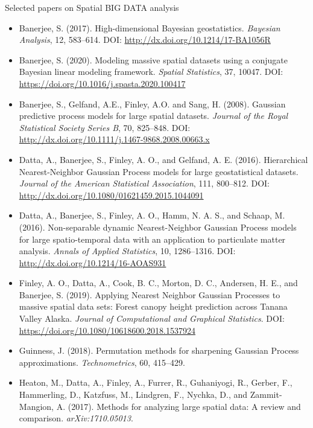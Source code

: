 \documentclass[
10pt]{beamer}
\begin{document}
\begin{frame}{Selected papers on Spatial BIG DATA analysis}

{\tiny
\begin{itemize}
 \item Banerjee, S. (2017). High-dimensional Bayesian geostatistics. \emph{Bayesian Analysis}, 12, 583--614. DOI: \url{http://dx.doi.org/10.1214/17-BA1056R}

 \item Banerjee, S. (2020). Modeling massive spatial datasets using a conjugate Bayesian linear modeling framework. \emph{Spatial Statistics}, 37, 10047. DOI: \url{https://doi.org/10.1016/j.spasta.2020.100417}
 
 \item Banerjee, S., Gelfand, A.E., Finley, A.O. and Sang, H. (2008). Gaussian predictive process models for large spatial datasets. \emph{Journal of the Royal Statistical Society Series B}, 70, 825--848. DOI: \url{http://dx.doi.org/10.1111/j.1467-9868.2008.00663.x}
 
 \item Datta, A., Banerjee, S., Finley, A. O., and Gelfand, A. E. (2016).  Hierarchical Nearest-Neighbor Gaussian Process models for large geostatistical datasets. \emph{Journal of the American Statistical Association}, 111, 800--812. DOI: \url{http://dx.doi.org/10.1080/01621459.2015.1044091}

 \item Datta, A., Banerjee, S., Finley, A. O., Hamm, N. A. S., and Schaap, M. (2016). Non-separable dynamic Nearest-Neighbor Gaussian Process models for large spatio-temporal data with an application to particulate matter analysis. \emph{Annals of Applied Statistics}, 10, 1286--1316. DOI: \url{http://dx.doi.org/10.1214/16-AOAS931}  
 
 \item Finley, A. O., Datta, A., Cook, B. C., Morton, D. C., Andersen, H. E., and Banerjee, S. (2019). Applying Nearest Neighbor Gaussian Processes to massive spatial data sets: Forest canopy height prediction across Tanana Valley Alaska. \emph{Journal of Computational and Graphical Statistics}. DOI: \url{https://doi.org/10.1080/10618600.2018.1537924}
 
 \item Guinness, J. (2018). Permutation methods for sharpening Gaussian Process approximations. \emph{Technometrics}, 60, 415--429.
 
 \item Heaton, M., Datta, A., Finley, A., Furrer, R., Guhaniyogi, R., Gerber, F., Hammerling, D., Katzfuss, M., Lindgren, F., Nychka, D., and Zammit-Mangion, A. (2017). Methods for analyzing large spatial data: A review and comparison. \emph{arXiv:1710.05013}.


\end{itemize}}
\end{frame}
\end{document}
